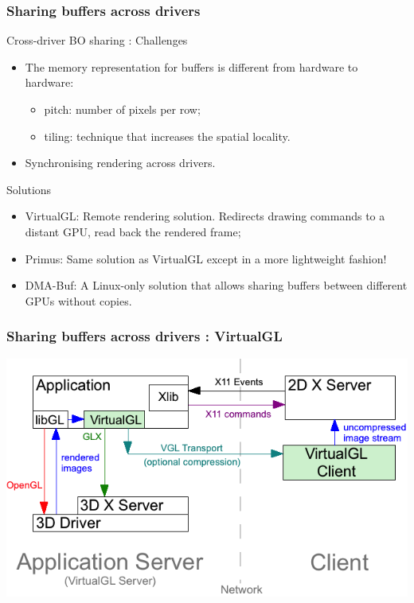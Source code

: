 \documentclass[11pt,english,compress]{beamer}
\begin{document}
\begin{frame}
	\frametitle{Sharing buffers across drivers}

	\begin{block}{Cross-driver BO sharing : Challenges}
		\begin{itemize}
			\item The memory representation for buffers is different from hardware to hardware:
			\begin{itemize}
				\item pitch: number of pixels per row;
				\item tiling: technique that increases the spatial locality.
			\end{itemize}
			\item Synchronising rendering across drivers.
		\end{itemize}
	\end{block}

	\begin{block}{Solutions}
		\begin{itemize}
			\item VirtualGL: Remote rendering solution. Redirects drawing commands to a distant GPU, read back the rendered frame;
			\item Primus: Same solution as VirtualGL except in a more lightweight fashion!
			\item DMA-Buf: A Linux-only solution that allows sharing buffers between different GPUs without copies.
		\end{itemize}
	\end{block}
\end{frame}

\begin{frame}
	\frametitle{Sharing buffers across drivers : VirtualGL}

	\begin{center}
		\includegraphics[width=\linewidth]{imgs/vgltransport.png}
	\end{center}
\end{frame}
\end{document}
